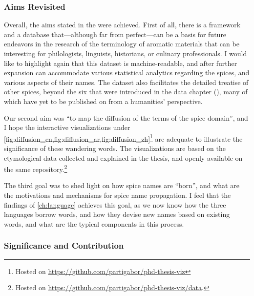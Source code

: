     

\subsubsection{Aims Revisited}

Overall, the aims stated in the  were achieved. First of all, there is a framework and a database that---although far from perfect---can be a basis for future endeavors in the research of the terminology of aromatic materials that can be interesting for philologists, linguists, historians, or culinary professionals. I would like to highlight again that this dataset is machine-readable, and after further expansion can accommodate various statistical analytics regarding the spices, and various aspects of their names. The dataset also facilitates the detailed treatise of other spices, beyond the six that were introduced in the data chapter (), many of which have yet to be published on from a humanities' perspective.

Our second aim was ``to map the diffusion of the terms of the spice domain'', and I hope the interactive visualizations under \cref{fig:diffusion_en,fig:diffusion_ar,fig:diffusion_zh}\footnote{Hosted on \url{https://github.com/partigabor/phd-thesis-viz}} are adequate to illustrate the significance of these wandering words. The visualizations are based on the etymological data collected and explained in the thesis, and openly available on the same repository.\footnote{Hosted on \url{https://github.com/partigabor/phd-thesis-viz/data}.}

The third goal was to shed light on how spice names are ``born'', and what are the motivations and mechanisms for spice name propagation. I feel that the findings of \cref{ch:language} achieves this goal, as we now know how the three languages borrow words, and how they devise new names based on existing words, and what are the typical components in this process.



\subsubsection{Significance and Contribution}

